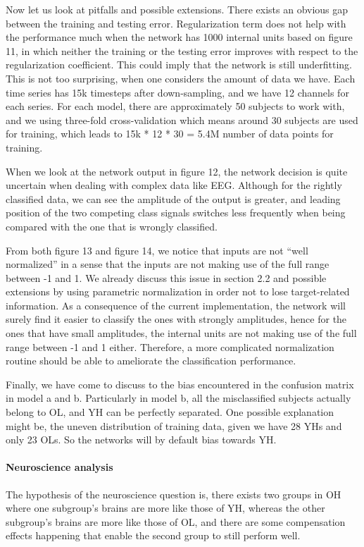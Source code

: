 \documentclass[a4paper,11pt,oneside]{article}
\begin{document}
 Now let us look at pitfalls and possible extensions. There exists an obvious gap between the training and testing error. Regularization term does not help with the performance much when the network has 1000 internal units based on figure 11, in which neither the training or the testing error improves with respect to the regularization coefficient. This could imply that the network is still underfitting. This is not too surprising, when one considers the amount of data we have. Each time series has 15k timesteps after down-sampling, and we have 12 channels for each series. For each model, there are approximately 50 subjects to work with, and we using three-fold cross-validation which means around 30 subjects are used for training, which leads to 15k * 12 * 30 = 5.4M number of data points for training.

When we look at the network output in figure 12, the network decision is quite uncertain when dealing with complex data like EEG. Although for the rightly classified data, we can see the amplitude of the output is greater, and leading position of the two competing class signals switches less frequently when being compared with the one that is wrongly classified.  

From both figure 13 and figure 14, we notice that inputs are not ``well normalized'' in a sense that the inputs are not making use of the full range between -1 and 1. We already discuss this issue in section 2.2 and possible extensions by using parametric normalization in order not to lose target-related information. As a consequence of the current implementation, the network will surely find it easier to classify the ones with strongly amplitudes, hence for the ones that have small amplitudes, the internal units are not making use of the full range between -1 and 1 either. Therefore, a more complicated normalization routine should be able to ameliorate the classification performance.

Finally, we have come to discuss to the bias encountered in the confusion matrix in model a and b. Particularly in model b, all the misclassified subjects actually belong to OL, and YH can be perfectly separated. One possible explanation might be, the uneven distribution of training data, given we have 28 YHs and only 23 OLs. So the networks will by default bias towards YH.

\paragraph{Neuroscience analysis}
The hypothesis of the neuroscience question is, there exists two groups in OH where one subgroup's brains are more like those of YH, whereas the other subgroup's brains are more like those of OL, and there are some compensation effects happening that enable the second group to still perform well. 
\end{document}
